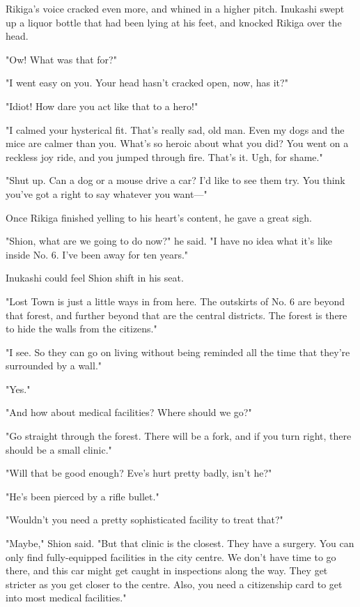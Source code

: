 Rikiga's voice cracked even more, and whined in a higher pitch. Inukashi
swept up a liquor bottle that had been lying at his feet, and knocked
Rikiga over the head.

"Ow! What was that for?"

"I went easy on you. Your head hasn't cracked open, now, has it?"

"Idiot! How dare you act like that to a hero!"

"I calmed your hysterical fit. That's really sad, old man. Even my dogs
and the mice are calmer than you. What's so heroic about what you did?
You went on a reckless joy ride, and you jumped through fire. That's it.
Ugh, for shame."

"Shut up. Can a dog or a mouse drive a car? I'd like to see them try.
You think you've got a right to say whatever you want---"

Once Rikiga finished yelling to his heart's content, he gave a great
sigh.

"Shion, what are we going to do now?" he said. "I have no idea what it's
like inside No. 6. I've been away for ten years."

Inukashi could feel Shion shift in his seat.

"Lost Town is just a little ways in from here. The outskirts of No. 6
are beyond that forest, and further beyond that are the central
districts. The forest is there to hide the walls from the citizens."

"I see. So they can go on living without being reminded all the time
that they're surrounded by a wall."

"Yes."

"And how about medical facilities? Where should we go?"

"Go straight through the forest. There will be a fork, and if you turn
right, there should be a small clinic."

"Will that be good enough? Eve's hurt pretty badly, isn't he?"

"He's been pierced by a rifle bullet."

"Wouldn't you need a pretty sophisticated facility to treat that?"

"Maybe," Shion said. "But that clinic is the closest. They have a
surgery. You can only find fully-equipped facilities in the city centre.
We don't have time to go there, and this car might get caught in
inspections along the way. They get stricter as you get closer to the
centre. Also, you need a citizenship card to get into most medical
facilities."

